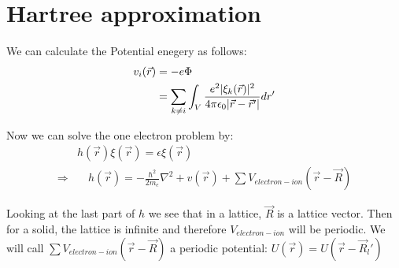 \section{Hartree approximation}
We can calculate the Potential enegery as follows:
\begin{align}
	v_i(\vec{r}) &= -e \Phi \\
	&= \sum_{k \neq i}^{}{\int_{V}^{}{\frac{e^2 \lvert\xi_k(\vec{r})\rvert^2}{4\pi \epsilon_0 \lvert\vec{r} - \vec{r}'\rvert}dr'}}
\end{align}

Now we can solve the one electron problem by:
\begin{align}
	& h(\vec{r})\xi(\vec{r}) = \epsilon \xi(\vec{r}) \\
	\Rightarrow & \quad h(\vec{r}) = -\frac{\hbar^2}{2m_e}\nabla^2 + v(\vec{r}) + \sum{V_{electron - ion}(\vec{r} - \vec{R})}
\end{align}
\par Looking at the last part of $h$ we see that in a lattice, $\vec{R}$ is a lattice vector. Then for a solid, the lattice is infinite and therefore $V_{electron - ion}$ will be periodic.
We will call $\sum{V_{electron - ion}(\vec{r} - \vec{R})}$ a periodic potential: $U(\vec{r}) = U(\vec{r} - \vec{R}_l')$ \\ \par
{}

